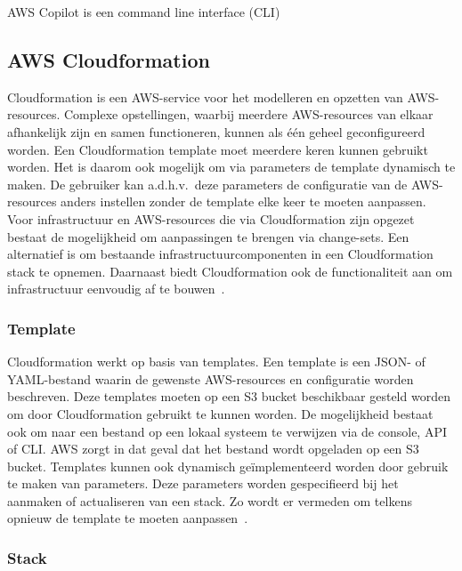 
AWS Copilot is een command line interface (CLI) ~\autocite{Kumar2022}

\subsection{AWS Cloudformation}
\label{sec:service-cloudformation}

Cloudformation is een AWS-service voor het modelleren en opzetten van AWS-resources.
Complexe opstellingen, waarbij meerdere AWS-resources van elkaar afhankelijk zijn en samen functioneren, kunnen als één geheel geconfigureerd worden.
Een Cloudformation template moet meerdere keren kunnen gebruikt worden.
Het is daarom ook mogelijk om via parameters de template dynamisch te maken.
De gebruiker kan a.d.h.v.\ deze parameters de configuratie van de AWS-resources anders instellen zonder de template elke keer te moeten aanpassen.
Voor infrastructuur en AWS-resources die via Cloudformation zijn opgezet bestaat de mogelijkheid om aanpassingen te brengen via change-sets.
Een alternatief is om bestaande infrastructuurcomponenten in een Cloudformation stack te opnemen.
Daarnaast biedt Cloudformation ook de functionaliteit aan om infrastructuur eenvoudig af te bouwen~\autocite{Mansoor2014}.

\subsubsection{Template}

Cloudformation werkt op basis van templates.
Een template is een JSON- of YAML-bestand waarin de gewenste AWS-resources en configuratie worden beschreven.
Deze templates moeten op een S3 bucket beschikbaar gesteld worden om door Cloudformation gebruikt te kunnen worden.
De mogelijkheid bestaat ook om naar een bestand op een lokaal systeem te verwijzen via de console, API of CLI.
AWS zorgt in dat geval dat het bestand wordt opgeladen op een S3 bucket.
Templates kunnen ook dynamisch geïmplementeerd worden door gebruik te maken van parameters.
Deze parameters worden gespecifieerd bij het aanmaken of actualiseren van een stack.
Zo wordt er vermeden om telkens opnieuw de template te moeten aanpassen~\autocite{AWSCLoudformationUser}.

\subsubsection{Stack}

